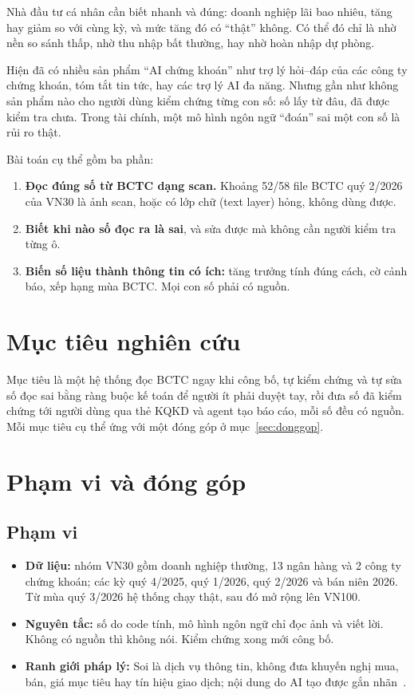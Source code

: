 \documentclass[12pt,a4paper]{report}
\newcommand{\enquote}[1]{“#1”}
\begin{document}
Nhà đầu tư cá nhân cần biết nhanh và đúng: doanh nghiệp lãi bao nhiêu, tăng hay giảm so với cùng kỳ, và mức tăng đó có
\enquote{thật} không. Có thể đó chỉ là nhờ nền so sánh thấp, nhờ thu nhập bất thường, hay nhờ hoàn nhập dự phòng.

Hiện đã có nhiều sản phẩm \enquote{AI chứng khoán} như trợ lý hỏi--đáp của các công ty chứng khoán, tóm tắt tin tức, hay
các trợ lý AI đa năng. Nhưng gần như không sản phẩm nào cho người dùng kiểm chứng từng con số: số lấy từ đâu, đã được
kiểm tra chưa. Trong tài chính, một mô hình ngôn ngữ \enquote{đoán} sai một con số là rủi ro thật.

Bài toán cụ thể gồm ba phần:
\begin{enumerate}
  \item \textbf{Đọc đúng số từ BCTC dạng scan.} Khoảng 52/58 file BCTC quý 2/2026 của VN30 là ảnh scan, hoặc có lớp chữ
        (text layer) hỏng, không dùng được.
  \item \textbf{Biết khi nào số đọc ra là sai}, và sửa được mà không cần người kiểm tra từng ô.
  \item \textbf{Biến số liệu thành thông tin có ích:} tăng trưởng tính đúng cách, cờ cảnh báo, xếp hạng mùa BCTC. Mọi
        con số phải có nguồn.
\end{enumerate}

\section{Mục tiêu nghiên cứu}
Mục tiêu là một hệ thống đọc BCTC ngay khi công bố, tự kiểm chứng và tự sửa số đọc sai bằng ràng buộc kế toán để
người ít phải duyệt tay, rồi đưa số đã kiểm chứng tới người dùng qua thẻ KQKD và agent tạo báo cáo, mỗi số đều có
nguồn. Mỗi mục tiêu cụ thể ứng với một đóng góp ở mục~\ref{sec:donggop}.

\section{Phạm vi và đóng góp}
\subsection{Phạm vi}
\begin{itemize}
  \item \textbf{Dữ liệu:} nhóm VN30 gồm doanh nghiệp thường, 13 ngân hàng và 2 công ty chứng khoán; các kỳ quý 4/2025,
        quý 1/2026, quý 2/2026 và bán niên 2026. Từ mùa quý 3/2026 hệ thống chạy thật, sau đó mở rộng lên VN100.
  \item \textbf{Nguyên tắc:} số do code tính, mô hình ngôn ngữ chỉ đọc ảnh và viết lời. Không có nguồn thì không nói.
        Kiểm chứng xong mới công bố.
  \item \textbf{Ranh giới pháp lý:} Soi là dịch vụ thông tin, không đưa khuyến nghị mua, bán, giá mục tiêu hay tín hiệu
        giao dịch; nội dung do AI tạo được gắn nhãn~\cite{luatai}.
\end{itemize}
\end{document}
